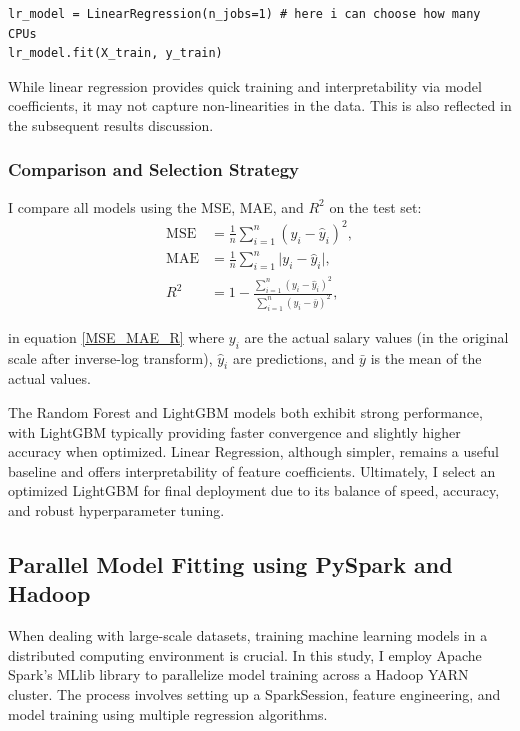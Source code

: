 \documentclass[12pt,a4paper]{article}
\begin{document}
\begin{multicols}{2}
\begin{lstlisting}
lr_model = LinearRegression(n_jobs=1) # here i can choose how many CPUs
lr_model.fit(X_train, y_train)
\end{lstlisting}
While linear regression provides quick training and interpretability via model coefficients, it may not capture non-linearities in the data.
This is also reflected in the subsequent results discussion.
\subsubsection{Comparison and Selection Strategy}
I compare all models using the MSE, MAE, and \(R^2\) on the test set:
\begin{equation}
    \begin{aligned}
    \text{MSE} &= \frac{1}{n}\sum_{i=1}^{n}(y_i - \hat{y}_i)^2,\\
    \text{MAE} &= \frac{1}{n}\sum_{i=1}^{n}\lvert y_i - \hat{y}_i\rvert,\\
    R^2 &= 1 - \frac{\sum_{i=1}^{n}(y_i - \hat{y}_i)^2}{\sum_{i=1}^{n}(y_i - \bar{y})^2},
    \end{aligned}
    \label{MSE_MAE_R}
\end{equation}
    
in equation \eqref{MSE_MAE_R} where \(y_i\) are the actual salary values (in the original scale after inverse-log transform), \(\hat{y}_i\) are predictions, and \(\bar{y}\) is the mean of the actual values.

The Random Forest and LightGBM models both exhibit strong performance, with LightGBM typically providing faster convergence and slightly higher accuracy when optimized. Linear Regression, although simpler, remains a useful baseline and offers interpretability of feature coefficients. Ultimately, I select an optimized LightGBM for final deployment due to its balance of speed, accuracy, and robust hyperparameter tuning. 

\subsection{Parallel Model Fitting using PySpark and Hadoop}

When dealing with large-scale datasets, training machine learning models in a distributed computing environment is crucial. In this study, I employ Apache Spark's MLlib library to parallelize model training across a Hadoop YARN cluster. The process involves setting up a SparkSession, feature engineering, and model training using multiple regression algorithms.


\end{multicols}
\end{document}
